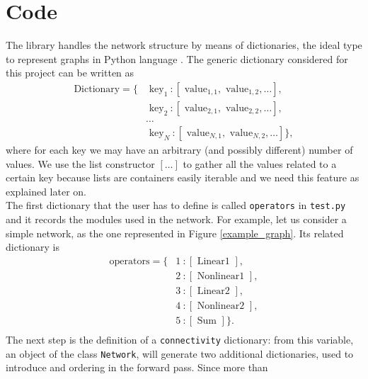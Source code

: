 \documentclass{article}
\begin{document}
\section{Code}\label{sec_code}
The library handles the network structure by means of dictionaries, the ideal type to represent graphs in Python language . 
The generic dictionary considered for this project can be written as
\begin{align*}
\text{Dictionary} =  \{  & \text{ key}_1  \: : [ \text{ value}_{1,1},  \text{ value}_{1,2}, \dots] ,  \\
&  \text{ key}_2  \: : [ \text{ value}_{2,1},  \text{ value}_{2,2},  \dots] , \\
& \dots \\
& \text{ key}_N  \: : [ \text{ value}_{N,1},  \text{ value}_{N,2},  \dots]  \},
\end{align*}
where for each key we may have an arbitrary (and possibly different) number of values. 
We use the list constructor $[ \dots ]$ to gather all the values related to a certain key because lists are containers easily iterable and we need this feature as explained later on. \\
The first dictionary that the user has to define is called \verb|operators| in \verb|test.py| and it records the modules used in the network. 
For example, let us consider a simple network, as the one represented in Figure \ref{example_graph}.
Its related dictionary is
\begin{align*}
\text{operators} =  \{  & 1  \: :  [\text{ Linear1 }], \\
&  2  \: : [\text{ Nonlinear1 }], \\
&  3  \: :  [\text{ Linear2 }], \\
& 4  \: :  [\text{ Nonlinear2 }],  \\
&  5  \: :  [\text{ Sum }]
 \}.\\ 
\end{align*}
The next step is the definition of a \verb|connectivity| dictionary: from this variable, an object of the class \verb|Network|, will generate two additional dictionaries, used to introduce and ordering in the forward pass. Since more than 
\end{document}
